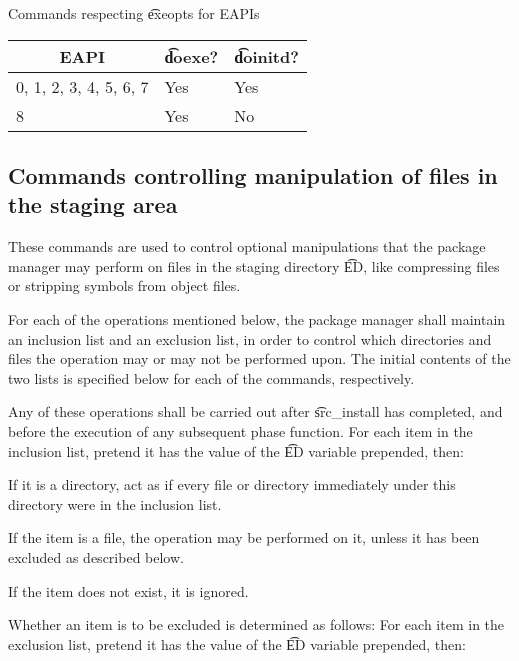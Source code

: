 \begin{centertable}{Commands respecting \t{exeopts} for EAPIs}
    \label{tab:exeopts-commands}
    \begin{tabular}{lll}
      \toprule
      \multicolumn{1}{c}{\textbf{EAPI}} &
      \multicolumn{1}{c}{\textbf{\t{doexe}?}} &
      \multicolumn{1}{c}{\textbf{\t{doinitd}?}} \\
      \midrule
      0, 1, 2, 3, 4, 5, 6, 7  & Yes & Yes \\
      8                       & Yes & No  \\
      \bottomrule
    \end{tabular}
\end{centertable}

\subsection{Commands controlling manipulation of files in the staging area}
These commands are used to control optional manipulations that the package manager may perform on
files in the staging directory \t{ED}, like compressing files or stripping symbols from object
files.

For each of the operations mentioned below, the package manager shall maintain an inclusion list
and an exclusion list, in order to control which directories and files the operation may or may not
be performed upon. The initial contents of the two lists is specified below for each of the
commands, respectively.

Any of these operations shall be carried out after \t{src_install} has completed, and before the
execution of any subsequent phase function. For each item in the inclusion list, pretend it has
the value of the \t{ED} variable prepended, then:

\begin{compactitem}
\item If it is a directory, act as if every file or directory immediately under this directory
    were in the inclusion list.
\item If the item is a file, the operation may be performed on it, unless it has been excluded as
    described below.
\item If the item does not exist, it is ignored.
\end{compactitem}

Whether an item is to be excluded is determined as follows: For each item in the exclusion list,
pretend it has the value of the \t{ED} variable prepended, then:

